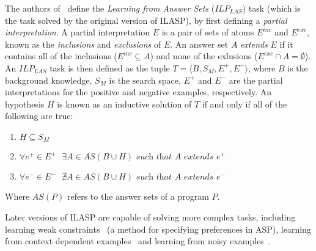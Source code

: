 \documentclass[../interim.tex]{subfiles}
\begin{document}
The authors of~\cite{ilasp-1} define the \textit{Learning from Answer Sets} ($ILP_{LAS}$) task (which is the task solved by the original version of ILASP), by first defining a \textit{partial interpretation}. A partial interpretation $E$ is a pair of sets of atoms $E^{inc}$ and $E^{exc}$, known as the \textit{inclusions} and \textit{exclusions} of $E$. An answer set $A$ \textit{extends} $E$ if it contains all of the inclusions ($E^{inc} \subseteq A$) and none of the exlusions ($E^{exc} \cap A = \emptyset$). An $ILP_{LAS}$ task is then defined as the tuple $T = \langle B, S_M, E^+, E^- \rangle$, where $B$ is the background knowledge, $S_M$ is the search space, $E^+$ and $E^-$ are the partial interpretations for the positive and negative examples, respectively. An hypothesis $H$ is known as an inductive solution of $T$ if and only if all of the following are true:
\begin{enumerate}
  \item $H \subseteq S_M$
  \item $\forall e^+ \in E^+ \text{ } \exists A \in AS(B \cup H) \textit{ such that } A \textit{ extends } e^+$
  \item $\forall e^- \in E^- \text{ } \nexists A \in AS(B \cup H) \textit{ such that } A \textit{ extends } e^-$
\end{enumerate}

\noindent
Where $AS(P)$ refers to the answer sets of a program $P$.

\vspace{3mm}
Later versions of ILASP are capable of solving more complex tasks, including learning weak constraints~\cite{ilasp-wc} (a method for specifying preferences in ASP), learning from context dependent examples~\cite{ilasp-cde} and learning from noisy examples~\cite{ilasp-noisy}.
\end{document}
